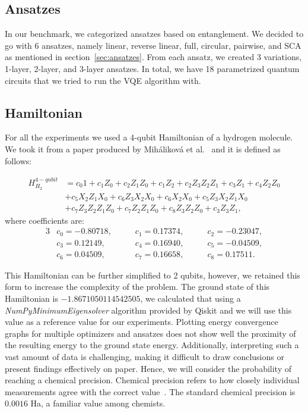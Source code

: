\subsection*{Ansatzes}
In our benchmark, we categorized ansatzes based on entanglement. We decided to go with 6 ansatzes, namely linear, reverse linear, full, circular, pairwise, and SCA as mentioned in section~\ref{sec:ansatzes}. From each ansatz, we created 3 variations, 1-layer, 2-layer, and 3-layer ansatzes. In total, we have 18 parametrized quantum circuits that we tried to run the VQE algorithm with.

\subsection*{Hamiltonian}
For all the experiments we used a 4-qubit Hamiltonian of a hydrogen molecule. We took it from a paper produced by Miháliková et al.~\cite{mihalikova} and it is defined as follows:

\begin{align*}H_{H_2}^{4-qubit} &= c_{0}1 + c_{1}Z_{0} + c_{2}Z_{1}Z_{0} + c_{1}Z_{2} + c_{2}Z_{3}Z_{2}Z_{1} + c_{3}Z_{1} + c_{4}Z_{2}Z_{0}\\
                                &+ c_{5}X_{2}Z_{1}X_{0} + c_{6}Z_{3}X_{2}X_{0} + c_{6}X_{2}X_{0} + c_{5}Z_{3}X_{2}Z_{1}X_{0}\\
                                &+c_{7}Z_{3}Z_{2}Z_{1}Z_{0} + c_{7}Z_{2}Z_{1}Z_{0} + c_{8}Z_{3}Z_{2}Z_{0} + c_{3}Z_{3}Z_{1}\text{,}
\end{align*}
where coefficients are:
\begin{alignat*}{3}
    &c_0 = -0.80718,\qquad &c_1 = 0.17374,\qquad &c_2 =-0.23047, \\
    &c_3 = 0.12149,\qquad  &c_4 = 0.16940,\qquad &c_5 = -0.04509, \\
    &c_6 = 0.04509,\qquad  &c_7 = 0.16658,\qquad &c_8 = 0.17511.
\end{alignat*}

This Hamiltonian can be further simplified to 2 qubits, however, we retained this form to increase the complexity of the problem. The ground state of this Hamiltonian is $-1.8671050114542505$, we calculated that using a \textit{NumPyMinimumEigensolver} algorithm provided by Qiskit and we will use this value as a reference value for our experiments. Plotting energy convergence graphs for multiple optimizers and ansatzes does not show well the proximity of the resulting energy to the ground state energy. Additionally, interpreting such a vast amount of data is challenging, making it difficult to draw conclusions or present findings effectively on paper. Hence, we will consider the probability of reaching a chemical precision. Chemical precision refers to how closely individual measurements agree with the correct value~\cite{chemistry}. The standard chemical precision is $0.0016$ Ha, a familiar value among chemists.

